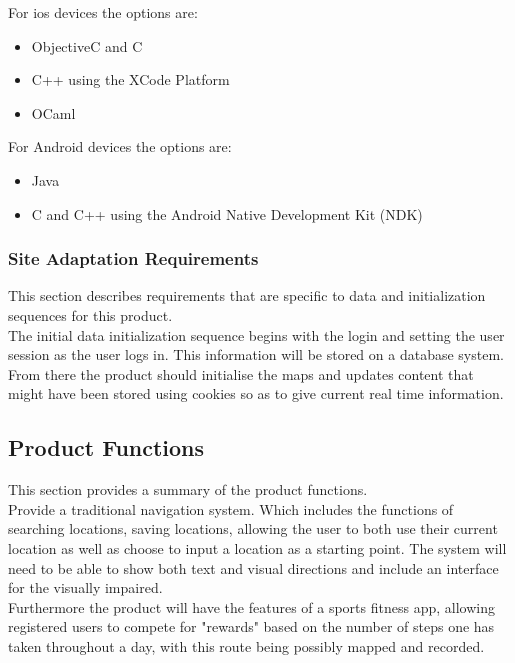 \documentclass[12pt]{article}
\begin{document}
		For ios devices the options are:
		\begin{itemize}
		\item ObjectiveC and C
		\item C++ using the XCode Platform
		\item OCaml
		\end{itemize}
		
		For Android devices the options are:
		\begin{itemize}
		\item Java
		\item C and C++ using the Android Native Development Kit (NDK)
		\end{itemize}
		
		\subsubsection{Site Adaptation Requirements}
		This section describes requirements that are specific to data and initialization sequences for this product.\\
		The initial data initialization sequence begins with the login and setting the user session as the user logs in. This information will be stored on a database system. From there the product should initialise the maps and updates content that might have been stored using cookies so as to give current real time information.\\
		
	\subsection{Product Functions}
	This section provides a summary of the product functions.\\
	
	Provide a traditional navigation system. Which includes the functions of searching locations, saving locations, allowing the user to both use their current location as well as choose to input a location as a starting point. The system will need to be able to show both text and visual directions and include an interface for the visually impaired.\\
		
	Furthermore the product will have the features of a sports fitness app, allowing registered users to compete for "rewards" based on the number of steps one has taken throughout a day, with this route being possibly mapped and recorded.\\
	
\end{document}

